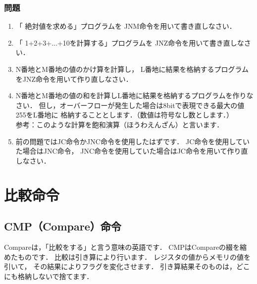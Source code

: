 \vfill
\subsubsection{問題}
\begin{enumerate}
\item 「 絶対値を求める」プログラムを
  JNM命令を用いて書き直しなさい．

\item 「 1+2+3+...+10を計算する」プログラムを
  JNZ命令を用いて書き直しなさい．

\item N番地とM番地の値のかけ算を計算し，
  L番地に結果を格納するプログラムをJNZ命令を用いて作り直しなさい．

\item N番地とM番地の値の和を計算しL番地に結果を格納するプログラムを作りなさい．
  但し，オーバーフローが発生した場合は8bitで表現できる最大の値255をL番地に
  格納することとします．（数値は符号なし数とします．）\\
  参考：このような計算を飽和演算（ほうわえんざん）と言います．

\item 前の問題ではJC命令かJNC命令を使用したはずです．
  JC命令を使用していた場合はJNC命令，
  JNC命令を使用していた場合はJC命令を用いて作り直しなさい．
\end{enumerate}
\vfill

\newpage
\section{比較命令}
\label{comp}

\subsection{CMP（Compare）命令}
Compareは，「比較をする」と言う意味の英語です．
CMPはCompareの綴を縮めたものです．
比較は引き算により行います．
レジスタの値からメモリの値を引いて，
その結果によりフラグを変化させます．
引き算結果そのものは，どこにも格納しないで捨てます．

